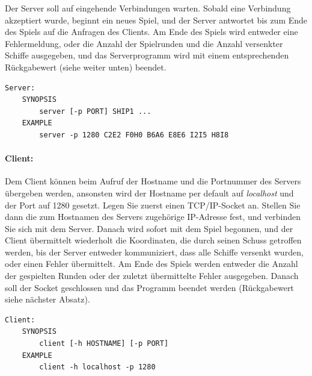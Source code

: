 Der Server soll auf eingehende Verbindungen warten. Sobald eine Verbindung
akzeptiert wurde, beginnt ein neues Spiel, und der Server antwortet bis zum
Ende des Spiels auf die Anfragen des Clients.
Am Ende des Spiels wird entweder eine Fehlermeldung,
oder die Anzahl der Spielrunden und die Anzahl versenkter Schiffe ausgegeben,
und das Serverprogramm wird mit einem entsprechenden Rückgabewert (siehe weiter
unten) beendet.

\begin{verbatim}
Server:
    SYNOPSIS
        server [-p PORT] SHIP1 ...
    EXAMPLE
        server -p 1280 C2E2 F0H0 B6A6 E8E6 I2I5 H8I8
\end{verbatim}

\paragraph{Client:}

Dem Client können beim Aufruf der Hostname und die Portnummer des Servers
übergeben werden, ansonsten wird der Hostname per default auf \emph{localhost}
und der Port auf 1280 gesetzt. Legen Sie zuerst einen
TCP/IP-Socket an. Stellen Sie dann die zum Hostnamen des Servers zugehörige
IP-Adresse fest, und verbinden Sie sich mit dem Server. Danach wird sofort mit
dem Spiel begonnen, und der Client übermittelt wiederholt die Koordinaten,
die durch seinen Schuss getroffen werden, bis der Server entweder kommuniziert,
dass alle Schiffe versenkt wurden, oder einen Fehler übermittelt. Am Ende des
Spiels werden entweder die Anzahl der gespielten Runden oder der zuletzt
übermittelte Fehler ausgegeben. Danach soll der Socket geschlossen und das
Programm beendet werden (Rückgabewert siehe nächster Absatz).

\begin{verbatim}
Client:
    SYNOPSIS
        client [-h HOSTNAME] [-p PORT]
    EXAMPLE
        client -h localhost -p 1280
\end{verbatim}

